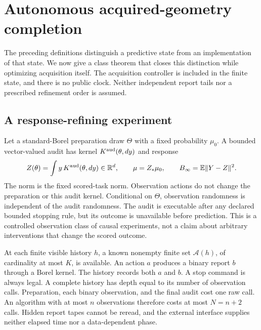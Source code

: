 \section{Autonomous acquired-geometry completion}\label{sec:adaptivecompletion}
The preceding definitions distinguish a predictive state from an implementation of that state. We now give a class theorem that closes this distinction while optimizing acquisition itself. The acquisition controller is included in the finite state, and there is no public clock. Neither independent report tails nor a prescribed refinement order is assumed.

\subsection{A response-refining experiment}
Let a standard-Borel preparation draw $\Theta$ with a fixed probability $\mu_0$. A bounded vector-valued audit has kernel $K^{\rm aud}(\theta,dy)$ and response
\[
 Z(\theta)=\int y\,K^{\rm aud}(\theta,dy)\in\mathbb R^d,\qquad
 \mu=Z_*\mu_0,\qquad B_\infty=\mathbb E\|Y-Z\|^2.
\]
The norm is the fixed scored-task norm. Observation actions do not change the preparation or this audit kernel. Conditional on $\Theta$, observation randomness is independent of the audit randomness. The audit is executable after any declared bounded stopping rule, but its outcome is unavailable before prediction. This is a controlled observation class of causal experiments, not a claim about arbitrary interventions that change the scored outcome.

At each finite visible history $h$, a known nonempty finite set $\mathcal A(h)$, of cardinality at most $K$, is available. An action $a$ produces a binary report $b$ through a Borel kernel. The history records both $a$ and $b$. A stop command is always legal. A complete history has depth equal to its number of observation calls. Preparation, each binary observation, and the final audit cost one raw call. An algorithm with at most $n$ observations therefore costs at most $N=n+2$ calls. Hidden report tapes cannot be reread, and the external interface supplies neither elapsed time nor a data-dependent phase.

